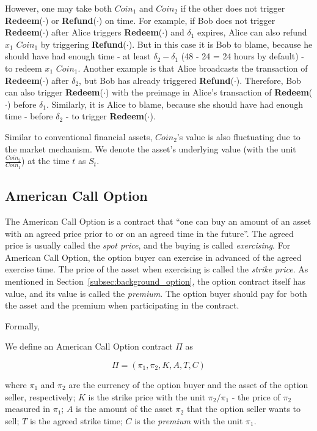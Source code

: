 However, one may take both $Coin_1$ and $Coin_2$ if the other does not trigger \textbf{Redeem}($\cdot$) or \textbf{Refund}($\cdot$) on time.
For example, if Bob does not trigger \textbf{Redeem}($\cdot$) after Alice triggers \textbf{Redeem}($\cdot$) and $\delta_1$ expires, Alice can also refund $x_1$ $Coin_1$ by triggering \textbf{Refund}($\cdot$).
But in this case it is Bob to blame, because he should have had enough time - at least $\delta_2 - \delta_1$ (48 - 24 = 24 hours by default) - to redeem $x_1$ $Coin_1$.
Another example is that Alice broadcasts the transaction of \textbf{Redeem}($\cdot$) after $\delta_2$, but Bob has already triggered \textbf{Refund}($\cdot$).
Therefore, Bob can also trigger \textbf{Redeem}($\cdot$) with the preimage in Alice's transaction of \textbf{Redeem}($\cdot$) before $\delta_1$.
Similarly, it is Alice to blame, because she should have had enough time - before $\delta_2$ - to trigger \textbf{Redeem}($\cdot$).

Similar to conventional financial assets, $Coin_2$'s value is also fluctuating due to the market mechanism.
We denote the asset's underlying value (with the unit $\frac{Coin_2}{Coin_1}$) at the time $t$ as $S_t$.















\subsection{American Call Option}

The American Call Option is a contract that ``one can buy an amount of an asset with an agreed price prior to or on an agreed time in the future''. 
The agreed price is usually called the \textit{spot price}, and the buying is called \textit{exercising}.
For American Call Option, the option buyer can exercise in advanced of the agreed exercise time.
The price of the asset when exercising is called the \textit{strike price}.
As mentioned in Section~\ref{subsec:background_option}, the option contract itself has value, and its value is called the \textit{premium}.
The option buyer should pay for both the asset and the premium when participating in the contract.

Formally,

\begin{definition}
We define an American Call Option contract $\Pi$ as

$$\Pi = (\pi_1, \pi_2, K, A, T, C)$$

where
$\pi_1$ and $\pi_2$ are the currency of the option buyer and the asset of the option seller, respectively; 
$K$ is the strike price with the unit $\pi_2 / \pi_1$ - the price of $\pi_2$ measured in $\pi_1$;
$A$ is the amount of the asset $\pi_2$ that the option seller wants to sell;
$T$ is the agreed strike time;
$C$ is the \textit{premium} with the unit $\pi_1$.
\end{definition}

